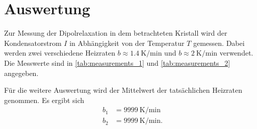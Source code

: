 \section{Auswertung}
\label{sec:Auswertung}
Zur Messung der Dipolrelaxation in dem betrachteten Kristall wird der Kondensatorstrom $I$ in Abhängigkeit von der Temperatur $T$ gemessen. Dabei werden zwei
verschiedene Heizraten $b\approx\qty{1,4}{\kelvin\per\minute}$ und $b\approx\qty{2}{\kelvin\per\minute}$ verwendet. Die Messwerte sind in \autoref{tab:measurements_1} und
\autoref{tab:measurements_2} angegeben.

Für die weitere Auswertung wird der Mittelwert der tatsächlichen Heizraten genommen. Es ergibt sich
\begin{align*}
    b_1 &= \qty{9999}{\kelvin\per\minute} \\
    b_2 &= \qty{9999}{\kelvin\per\minute}. \\
\end{align*}

